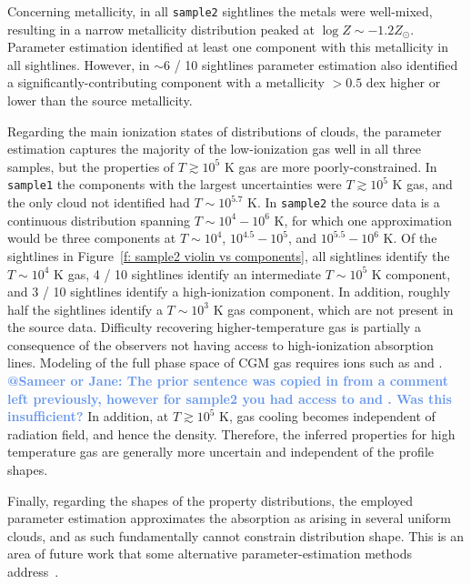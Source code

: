 \documentclass[fleqn,usenatbib]{mnras}
\makeatletter
\newcommand{\atsameer}[1]{\textcolor{CornflowerBlue}{\textbf{@Sameer or Jane: #1}}}
\makeatother
\begin{document}
Concerning metallicity, in all \texttt{sample2} sightlines the metals were well-mixed, resulting in a narrow metallicity distribution peaked at $\log Z \sim -1.2 Z_\odot$.
Parameter estimation identified at least one component with this metallicity in all sightlines.
However, in $\sim 6$ / 10 sightlines parameter estimation also identified a significantly-contributing component with a metallicity $>0.5$ dex higher or lower than the source metallicity.

Regarding the main ionization states of distributions of clouds,
the parameter estimation captures the majority of the low-ionization gas well in all three samples, but the properties of $T \gtrsim 10^5$ K gas are more poorly-constrained.
In \texttt{sample1} the components with the largest uncertainties were $T \gtrsim 10^5$ K gas,
and the only cloud not identified had $T \sim 10^{5.7}$ K.
In \texttt{sample2} the source data is a continuous distribution spanning $T \sim 10^4 - 10^6$ K,
for which one approximation would be three components at $T\sim 10^4$, $10^{4.5}-10^5$, and $10^{5.5}-10^6$ K.
Of the sightlines in Figure~\ref{f: sample2 violin vs components}, 
all sightlines identify the $T \sim 10^4$ K gas,
4 / 10 sightlines identify an intermediate $T \sim 10^5$ K component,
and 3 / 10 sightlines identify a high-ionization component.
In addition, roughly half the sightlines identify a $T \sim 10^3$ K gas component, which are not present in the source data.
Difficulty recovering higher-temperature gas is partially a consequence of the observers not having access to high-ionization absorption lines.
Modeling of the full phase space of CGM gas requires ions such as  and .
\atsameer{The prior sentence was copied in from a comment left previously, however for sample2 you had access to \ion{Ne}{VIII} and \ion{Mg}{X}. Was this insufficient?}
In addition, at $T \gtrsim 10^5$ K, gas cooling becomes independent of radiation field, and hence the density. 
Therefore, the inferred properties for high temperature gas are generally more uncertain and independent of the profile shapes.

Finally, regarding the shapes of the property distributions,
the employed parameter estimation approximates the absorption as arising in several uniform clouds,
and as such fundamentally cannot constrain distribution shape.
This is an area of future work that some alternative parameter-estimation methods address~\citep[e.g.][]{stern2016Universal}.
\end{document}
